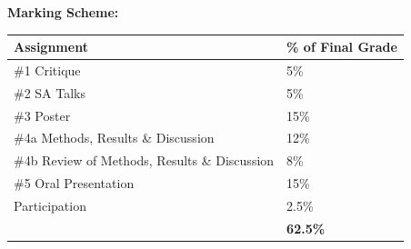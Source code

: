 \documentclass[hidelinks]{article}
\begin{document}
\vspace{0.3cm}


	\textbf{Marking Scheme:}
		\begin{table}[H]
		\centering
			\begin{tabular}{l l}
				\toprule
				\textbf{Assignment} & \textbf{\% of Final Grade}\\
				\midrule
				\#1 Critique & 5\%\\
				\addlinespace
				\#2 SA Talks & 5\%\\
				\addlinespace
				\#3 Poster & 15\%\\
				\addlinespace
				\#4a Methods, Results \& Discussion & 12\%\\
				\addlinespace
				\#4b Review of Methods, Results \& Discussion & 8\%\\
				\addlinespace
				\#5 Oral Presentation & 15\%\\
				\addlinespace
				Participation & 2.5\%\\
				\midrule
				& \textbf{62.5\%}\\
				\bottomrule
			\end{tabular}
		\end{table}	
\end{document}
